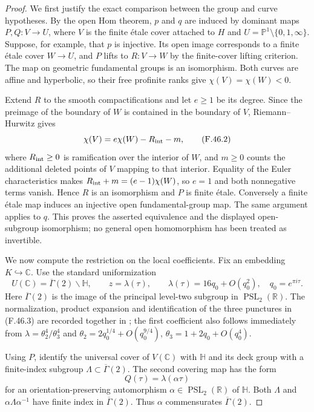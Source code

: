 \documentclass[11pt,oneside]{article}
\begin{document}
\begin{proof}
We first justify the exact comparison between the group and
curve hypotheses. By the open Hom theorem, $p$ and $q$ are
induced by dominant maps $P,Q:V\to U$, where $V$ is the
finite \'etale cover attached to $H$ and
$U=\mathbb P^1\setminus\{0,1,\infty\}$. Suppose, for example,
that $p$ is injective. Its open image corresponds to a finite
\'etale cover $W\to U$, and $P$ lifts to $R:V\to W$ by the
finite-cover lifting criterion. The map on geometric fundamental
groups is an isomorphism. Both curves are affine and hyperbolic,
so their free profinite ranks give
$\chi(V)=\chi(W)<0$.

Extend $R$ to the smooth compactifications and let $e\ge1$
be its degree. Since the preimage of the boundary of $W$ is
contained in the boundary of $V$, Riemann--Hurwitz gives
\[
 \chi(V)=e\chi(W)-R_{\rm int}-m,
 \tag{F.46.2}
\]
where $R_{\rm int}\ge0$ is ramification over the interior of
$W$, and $m\ge0$ counts the additional deleted points of $V$
mapping to that interior. Equality of the Euler characteristics
makes $R_{\rm int}+m=(e-1)\chi(W)$, so $e=1$ and both
nonnegative terms vanish. Hence $R$ is an isomorphism and $P$
is finite \'etale. Conversely a finite \'etale map induces an
injective open fundamental-group map. The same argument applies
to $q$. This proves the asserted equivalence and the displayed
open-subgroup isomorphism; no general open homomorphism has
been treated as invertible.

We now compute the restriction on the local coefficients.
Fix an embedding $K\hookrightarrow\mathbb C$. Use the standard
uniformization
\[
 U(\mathbb C)=\overline\Gamma(2)\backslash\mathbb H,
 \qquad z=\lambda(\tau),\qquad
 \lambda(\tau)=16q_0+O(q_0^2),\quad q_0=e^{\pi i\tau}.
 \tag{F.46.3}
\]
Here $\overline\Gamma(2)$ is the image of the principal
level-two subgroup in $\operatorname{PSL}_2(\mathbb R)$.
The normalization, product expansion and identification of the
three punctures in (F.46.3) are recorded together in
\cite[\S1, equation (1.0.2), p.~628]{F-CalegariDimitrovTang};
the first coefficient also follows immediately from
$\lambda=\theta_2^4/\theta_3^4$ and
$\theta_2=2q_0^{1/4}+O(q_0^{9/4})$,
$\theta_3=1+2q_0+O(q_0^4)$.

Using $P$, identify the universal cover of $V(\mathbb C)$
with $\mathbb H$ and its deck group with a finite-index
subgroup $\Lambda\subset\overline\Gamma(2)$. The second
covering map has the form
\[
                  Q(\tau)=\lambda(\alpha\tau)
\]
for an orientation-preserving automorphism
$\alpha\in\operatorname{PSL}_2(\mathbb R)$ of $\mathbb H$.
Both $\Lambda$ and $\alpha\Lambda\alpha^{-1}$ have finite
index in $\overline\Gamma(2)$. Thus $\alpha$ commensurates
$\overline\Gamma(2)$.


\end{proof}
\end{document}

